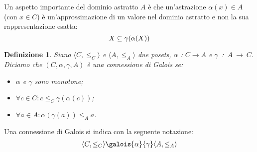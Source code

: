 \documentclass[a4paper, 10pt]{report}
\newtheorem{definit}{Definizione}
\begin{document}
\noindent
Un aspetto importante del dominio astratto $A$ è che un'astrazione $\alpha(x) \in A$ (con $x \in C$) è un'approssimazione di un valore nel dominio astratto e non la sua rappresentazione esatta:
$$
X \subseteq \gamma(\alpha(X))\smallskip
$$

\begin{definit}
	Siano $\langle C,\leq_C \rangle$ e $\langle A,\leq_A \rangle$ due posets, $\alpha$ : $C \longrightarrow A$ e $\gamma$~:~$A~\longrightarrow~C$. Diciamo che $(C,\alpha,\gamma,A)$ è una connessione di Galois se:
	\frenchspacing
	\begin{itemize}
		\item $\alpha$ e $\gamma$ sono monotone;
		\item $\forall c \in C : c \leq_C \gamma (\alpha (c))$;
		\item $\forall a \in A : \alpha (\gamma (a)) \leq_A a$.
	\end{itemize}
\end{definit}
Una connessione di Galois si indica con la seguente notazione:
\begin{align*}
\langle C,\leq_C \rangle \galois{\alpha}{\gamma} \langle A,\leq_A \rangle
\end{align*}
\end{document}
